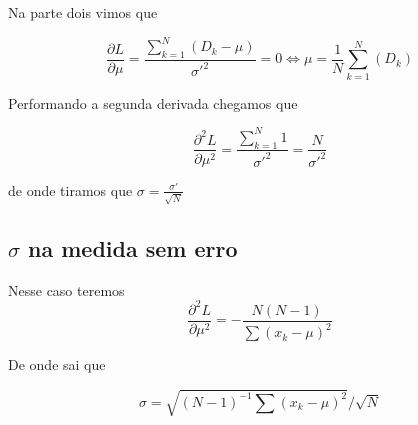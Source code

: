 \documentclass{article}
\begin{document}
Na parte dois vimos que

\begin{equation*}
    \frac{\partial L}{\partial \mu} = \frac{\sum_{k=1}^{N}(D_k-\mu)}{\sigma'^2} = 0 \iff \mu = \frac{1}{N}\sum_{k=1}^{N}(D_k)
\end{equation*}

Performando a segunda derivada chegamos que

\begin{equation*}
    \frac{\partial^2 L}{\partial \mu^2} = \frac{\sum_{k=1}^{N} 1}{\sigma'^2} = \frac{N}{\sigma'^2} 
\end{equation*}

de onde tiramos que $\sigma = \frac{\sigma'}{\sqrt{N}}$

\subsection{$\sigma$ na medida sem erro}

Nesse caso teremos
\begin{equation*}
      \frac{\partial^2 L}{\partial \mu^2} = -\frac{N(N-1)}{\sum(x_k-\mu)^2}
\end{equation*}

De onde sai que

\begin{equation*}
    \sigma = \sqrt{(N-1)^{-1}\sum(x_k-\mu)^2} / \sqrt{N}
\end{equation*}
\end{document}
